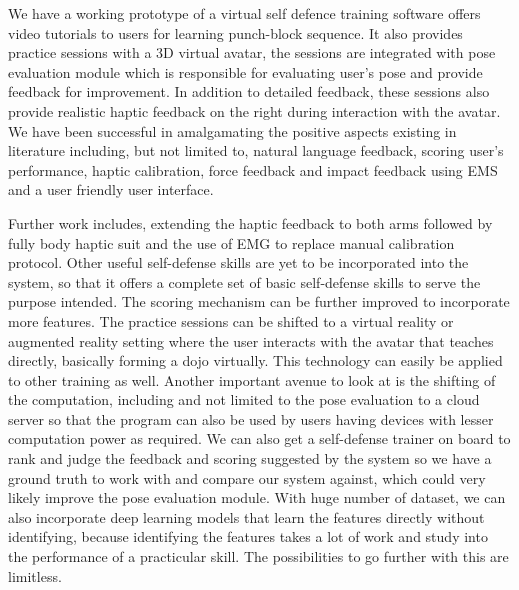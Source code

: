 We have a working prototype of a virtual self defence training software offers video tutorials to users for learning punch-block sequence. It also provides practice sessions with a 3D virtual avatar, the sessions are integrated with pose evaluation module which is responsible for evaluating user's pose and provide feedback for improvement. In addition to detailed feedback, these sessions also provide realistic haptic feedback on the right during interaction with the avatar. We have been successful in amalgamating the positive aspects existing in literature including, but not limited to, natural language feedback, scoring user's performance, haptic calibration, force feedback and impact feedback using EMS and a user friendly user interface. 


Further work includes, extending the haptic feedback to both arms followed by fully body haptic suit and the use of EMG to replace manual calibration protocol. Other useful self-defense skills are yet to be incorporated into the system, so that it offers a complete set of basic self-defense skills to serve the purpose intended. The scoring mechanism can be further improved to incorporate more features. The practice sessions can be shifted to a virtual reality or augmented reality setting where the user interacts with the avatar that teaches directly, basically forming a dojo virtually. This technology can easily be applied to other training as well. Another important avenue to look at is the shifting of the computation, including and not limited to the pose evaluation to a cloud server so that the program can also be used by users having devices with lesser computation power as required. We can also get a self-defense trainer on board to rank and judge the feedback and scoring suggested by the system so we have a ground truth to work with and compare our system against, which could very likely improve the pose evaluation module. With huge number of dataset, we can also incorporate deep learning models that learn the features directly without identifying, because identifying the features takes a lot of work and study into the performance of a practicular skill. The possibilities to go further with this are limitless.
